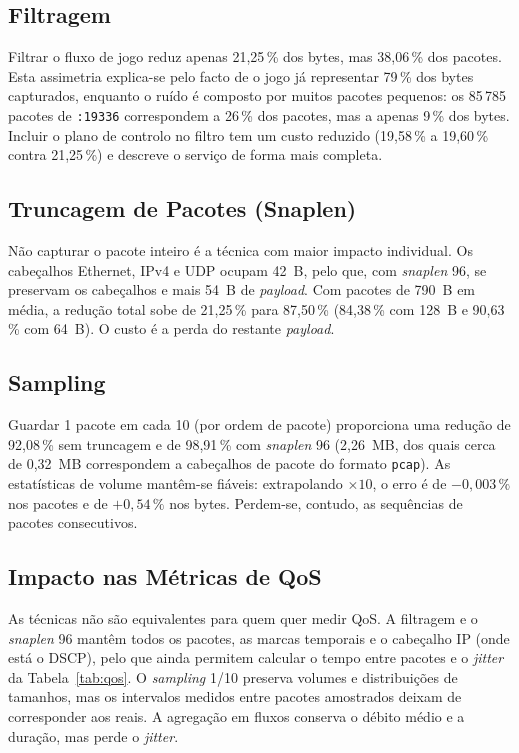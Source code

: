 \documentclass[11pt,a4paper]{article}
\begin{document}
\subsection{Filtragem}
Filtrar o fluxo de jogo reduz apenas 21,25\,\% dos bytes, mas 38,06\,\% dos pacotes. Esta assimetria explica-se pelo facto de o
jogo já representar 79\,\% dos bytes capturados, enquanto o ruído é composto por muitos pacotes pequenos: os 85\,785 pacotes de
\texttt{:19336} correspondem a 26\,\% dos pacotes, mas a apenas 9\,\% dos bytes. Incluir o plano de controlo no filtro tem um
custo reduzido (19,58\,\% a 19,60\,\% contra 21,25\,\%) e descreve o serviço de forma mais completa.

\subsection{Truncagem de Pacotes (Snaplen)}
Não capturar o pacote inteiro é a técnica com maior impacto individual. Os cabeçalhos Ethernet, IPv4 e UDP ocupam 42~B, pelo
que, com \emph{snaplen} 96, se preservam os cabeçalhos e mais 54~B de \emph{payload}. Com pacotes de 790~B em média, a redução
total sobe de 21,25\,\% para 87,50\,\% (84,38\,\% com 128~B e 90,63\,\% com 64~B). O custo é a perda do restante \emph{payload}.

\subsection{Sampling}
Guardar 1 pacote em cada 10 (por ordem de pacote) proporciona uma redução de 92,08\,\% sem truncagem e de 98,91\,\% com
\emph{snaplen} 96 (2,26~MB, dos quais cerca de 0,32~MB correspondem a cabeçalhos de pacote do formato \texttt{pcap}). As
estatísticas de volume mantêm-se fiáveis: extrapolando $\times 10$, o erro é de $-0{,}003\,\%$ nos pacotes e de $+0{,}54\,\%$
nos bytes. Perdem-se, contudo, as sequências de pacotes consecutivos.

\subsection{Impacto nas Métricas de QoS}
As técnicas não são equivalentes para quem quer medir QoS. A filtragem e o \emph{snaplen} 96 mantêm todos os pacotes, as marcas
temporais e o cabeçalho IP (onde está o DSCP), pelo que ainda permitem calcular o tempo entre pacotes e o \emph{jitter} da
Tabela~\ref{tab:qos}. O \emph{sampling} 1/10 preserva volumes e distribuições de tamanhos, mas os intervalos medidos entre
pacotes amostrados deixam de corresponder aos reais. A agregação em fluxos conserva o débito médio e a duração, mas perde o
\emph{jitter}.
\end{document}
